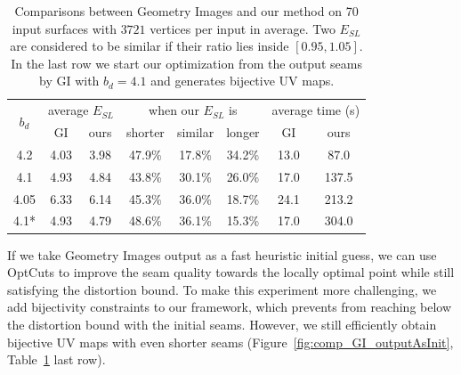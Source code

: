 \begin{table}[!h]
\centering
\caption{Comparisons between Geometry Images and our method on 70 input surfaces with $3721$ vertices per input in average. Two $E_{SL}$ are considered to be similar if their ratio lies inside $[0.95, 1.05]$. In the last row we start our optimization from the output seams by GI with $b_d = 4.1$ and generates bijective UV maps.} 
\label{tb:comp_GI}
\begin{tabular}{@{}cccccccc@{}}
\toprule
\multirow{2}{*}{$b_d$} & \multicolumn{2}{c}{average $E_{SL}$}             & \multicolumn{3}{c}{when our $E_{SL}$ is}                         & \multicolumn{2}{c}{average time (s)}       \\ \cmidrule(l){2-8} 
                   & GI & ours & shorter & similar & longer & GI & ours \\ \midrule
4.2                & 4.03             & 3.98           &  47.9\%  & 17.8\%  & 34.2\% & 13.0          & 87.0        \\
4.1                & 4.93             & 4.84           &  43.8\%  & 30.1\%  & 26.0\% & 17.0        & 137.5        \\
4.05               & 6.33             & 6.14           &  45.3\%  & 36.0\%  & 18.7\% &  24.1        & 213.2        \\ 
4.1*               & 4.93             & 4.79           &  48.6\%  & 36.1\%  & 15.3\% &  17.0        & 304.0        \\ \bottomrule
\end{tabular}
\end{table}

If we take Geometry Images output as a fast heuristic initial guess, we can use OptCuts to improve the seam quality towards the locally optimal point while still satisfying the distortion bound. To make this experiment more challenging, we add bijectivity constraints to our framework, which prevents from reaching below the distortion bound with the initial seams. However, we still efficiently obtain bijective UV maps with even shorter seams (Figure~\ref{fig:comp_GI_outputAsInit}, Table~\ref{tb:comp_GI} last row).

